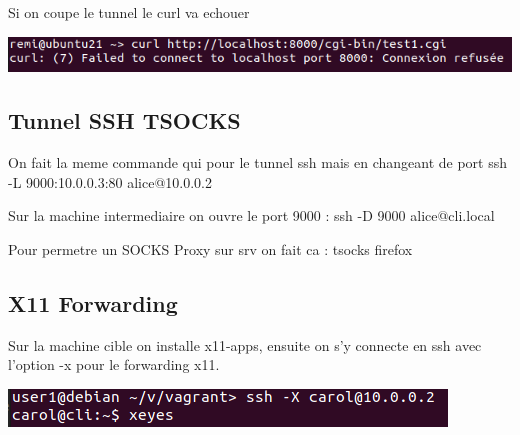 \documentclass{article}
\begin{document}
 Si on coupe le tunnel le curl va echouer
 
 \begin{center}
        \includegraphics[scale=0.5]{Images/curlfail.png}
 \end{center}
 
 
 
 \subsection{\large{Tunnel SSH TSOCKS}}
 
 On fait la meme commande qui pour le tunnel ssh mais en changeant de port ssh -L 9000:10.0.0.3:80 alice@10.0.0.2 \par
 
 Sur la machine intermediaire on ouvre le port 9000 : ssh -D 9000 alice@cli.local \par
 
 Pour permetre un SOCKS Proxy sur srv on fait ca : tsocks firefox \par
 
 
 \newpage
 
 
 \subsection{\large{X11 Forwarding}}
 
 Sur la machine cible on installe x11-apps, ensuite on s'y connecte en ssh avec l'option -x pour le forwarding x11.
 
 \begin{center}
        \includegraphics[scale=0.5]{Images/x11.png}
 \end{center}
 
\end{document}
